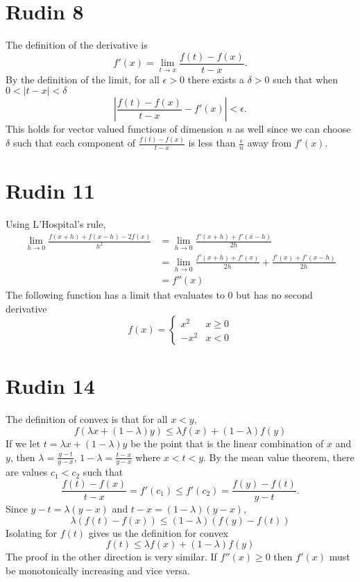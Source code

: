 \documentclass{article}
\begin{document}
\section*{Rudin 8}
The definition of the derivative is 
\[
	f'(x) =\lim_{t \to x} \frac{f(t) - f(x)}{t-x}.
\]
By the definition of the limit,
for all $\epsilon > 0$ there exists a $\delta > 0$ such that when $0 < |t-x| < \delta$
\[
	\left|\frac{f(t) - f(x)}{t-x} -f'(x)\right| < \epsilon.
\]
This holds for vector valued functions of dimension $n$ 
as well since we can choose $\delta$ such that 
each component of $\frac{f(t) - f(x)}{t-x}$ is less than $\frac{\epsilon}{n}$ away from $f'(x)$.
\newpage
	
\section*{Rudin 11}
Using L'Hospital's rule,
\begin{align*}
	\lim_{h\to 0} \frac{f(x+h) + f(x-h) - 2f(x)}{h^2} &= \lim_{h\to 0} \frac{f'(x+h) + f'(x-h)}{2h} \\
	&= \lim_{h\to 0} \frac{f'(x+h) + f'(x)}{2h} + \frac{f'(x) + f'(x-h)}{2h} \\
	&= f''(x)
\end{align*}
The following function has a limit that evaluates to 0 but has no second derivative
\[
	f(x) = 
	\begin{cases}
		x^2 & x\geq 0 \\
		-x^2 & x < 0
	\end{cases}
\]
\newpage

\section*{Rudin 14}
The definition of convex is that for all $x < y$,
\[
	f(\lambda x + (1-\lambda)y) \leq \lambda f(x) + (1- \lambda)f(y)
\]
If we let $t= \lambda x + (1-\lambda)y$ be the point that is the linear combination of $x$ and $y$,
then $\lambda = \frac{y-t}{y-x}$, $1-\lambda = \frac{t-x}{y-x}$ where $x < t < y$.
By the mean value theorem,
there are values $c_1 < c_2$ such that 
\[
	\frac{f(t) - f(x)}{t-x} = f'(c_1) \leq f'(c_2) = \frac{f(y) - f(t)}{y-t}.
\]
Since $y-t = \lambda(y-x)$ and $t-x = (1-\lambda)(y-x)$,
\[
	\lambda(f(t) - f(x)) \leq (1-\lambda)(f(y)-f(t))
\]
Isolating for $f(t)$ gives us the definition for convex
\[
	f(t) \leq \lambda f(x) + (1-\lambda)f(y)
\]
The proof in the other direction is very similar.
If $f''(x) \geq 0$ then $f'(x)$ must be monotonically increasing and 
vice versa.
\newpage 
\end{document}
